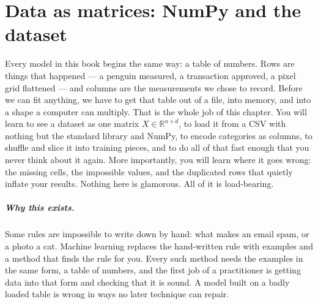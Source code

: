 \chapter{Data as matrices: NumPy and the dataset}\label{ch:data}

Every model in this book begins the same way: a table of numbers. Rows are
things that happened --- a penguin measured, a transaction approved, a pixel
grid flattened --- and columns are the measurements we chose to record. Before
we can fit anything, we have to get that table out of a file, into memory, and
into a shape a computer can multiply. That is the whole job of this chapter.
You will learn to see a dataset as one matrix $X\in\mathbb R^{n\times d}$, to
load it from a CSV with nothing but the standard library and NumPy, to encode
categories as columns, to shuffle and slice it into training pieces, and to do
all of that fast enough that you never think about it again. More importantly,
you will learn where it goes wrong: the missing cells, the impossible values,
and the duplicated rows that quietly inflate your results. Nothing here is
glamorous. All of it is load-bearing.

\paragraph{Why this exists.} Some rules are impossible to write down by hand: what
makes an email spam, or a photo a cat. Machine learning replaces the hand-written rule with examples and a method
that finds the rule for you. Every such method needs the examples in the same form, a table of numbers, and
the first job of a practitioner is getting data into that form and checking that it is sound. A model built
on a badly loaded table is wrong in ways no later technique can repair.

